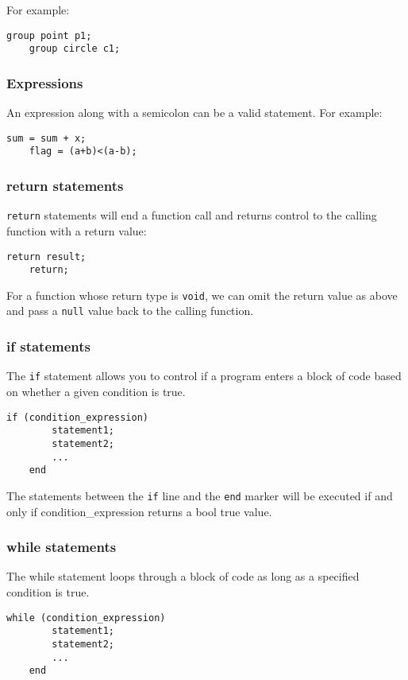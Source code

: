 \documentclass[11pt,letterpaper]{article}
\begin{document}
For example:
\begin{lstlisting}[tabsize=4]
	group point p1;
	group circle c1;
\end{lstlisting}

\subsubsection {Expressions}
An expression along with a semicolon can be a valid statement. For example:
\begin{lstlisting}[tabsize=4]
	sum = sum + x;
	flag = (a+b)<(a-b);
\end{lstlisting}

\subsubsection {return statements}
\texttt{return} statements will end a function call and returns control to the calling function with a return value:
\begin{lstlisting}[tabsize=4]
	return result;
	return;
\end{lstlisting}

For a function whose return type is \texttt{void}, we can omit the return value as above and pass a \texttt{null} value back to the calling function.

\subsubsection {if statements}
The \texttt{if} statement allows you to control if a program enters a block of code based on whether a given condition is true. 

\begin{lstlisting}[tabsize=4]
	if (condition_expression)
   		statement1;
   		statement2;
		...
	end
\end{lstlisting}

The statements between the \texttt{if} line and the \texttt{end} marker will be executed if and only if condition\_expression returns a bool true value.

\subsubsection {while statements}
The while statement loops through a block of code as long as a specified condition is true.

\begin{lstlisting}[tabsize=4]
	while (condition_expression)
   		statement1;
	   	statement2;
		...
	end
\end{lstlisting}
\end{document}
